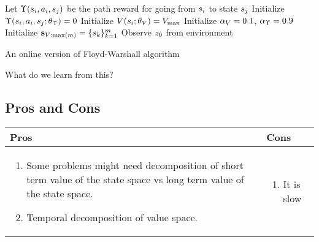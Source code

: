     \begin{algorithm}
      Let $\Upsilon(s_i, a_i, s_j)$ be the path reward for going from $s_i$ to state $s_j$ \;
      Initialize $\Upsilon(s_i, a_i, s_j; \theta_{\Upsilon}) = 0$ \;
      Initialize $V(s_i; \theta_{V}) = V_{\text{max}}$ \;
      Initialize $\alpha_V = 0.1$, $\alpha_\Upsilon = 0.9$ \;
      Initialize $\mathbf{s}_{V:\text{max}(m)} = \{ s_k \}_{k=1}^{m}$ \;
      Observe $z_0$ from environment\;
      \caption{\small An online version of Floyd-Warshall algorithm}
      \label{alg:floyd-warshall}
    \end{algorithm}

What do we learn from this?

\subsection{Pros and Cons}
\begin{tabular}{p{}p{}}
  \toprule
  Pros & Cons \\
  \midrule
\begin{enumerate}
  \item Some problems might need decomposition of short term value of the state space vs long term value of the state space.
  \item Temporal decomposition of value space.
\end{enumerate}
 & 
\begin{enumerate}
  \item It is slow
\end{enumerate}

\\ \bottomrule
\end{tabular}
